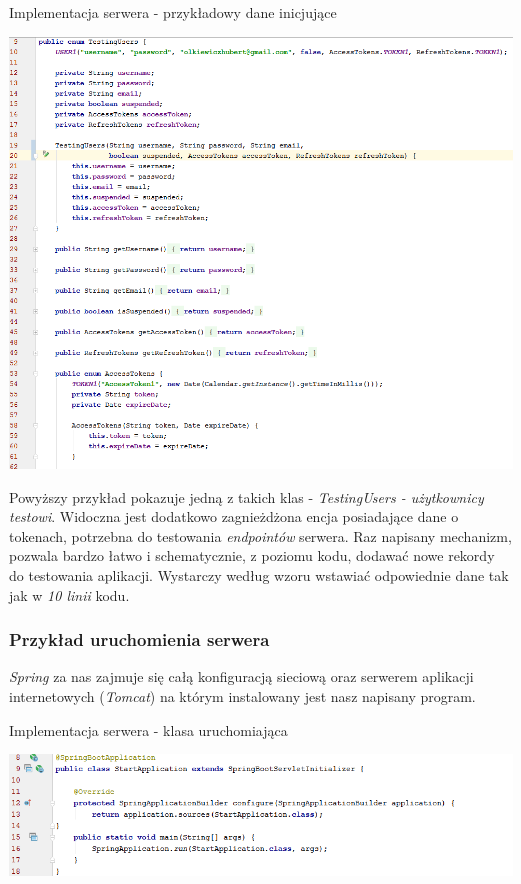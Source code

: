 \documentclass[10pt,titlepage]{article} %
\begin{document}
\begin{listing}[H]
\caption[Implementacja serwera - przykładowy dane inicjujące]{Implementacja serwera - przykładowy dane inicjujące}
\includegraphics[width=1.0\textwidth, height=0.8\textheight]{img/sekcja3/backend/daneInicjalizacyjne}
\end{listing}

Powyższy przykład pokazuje jedną z takich klas - \textit{TestingUsers - użytkownicy testowi}. Widoczna jest dodatkowo zagnieżdżona encja posiadające dane o tokenach, potrzebna do testowania \textit{endpointów} serwera. Raz napisany mechanizm, pozwala bardzo łatwo i schematycznie, z poziomu kodu, dodawać nowe rekordy do testowania aplikacji. Wystarczy według wzoru wstawiać odpowiednie dane tak jak w \textit{10 linii} kodu.

\subsubsection{Przykład uruchomienia serwera}
\textit{Spring} za nas zajmuje się całą konfiguracją sieciową oraz serwerem aplikacji internetowych (\textit{Tomcat}) na którym instalowany jest nasz napisany program.

\begin{listing}[H]
\centering
\caption[Implementacja serwera - klasa uruchomiająca]{Implementacja serwera -  klasa uruchomiająca}
\includegraphics[width=\textwidth]{img/sekcja3/backend/klasaStartowa}
\end{listing}
\end{document}
